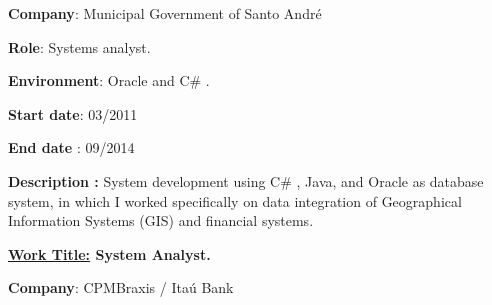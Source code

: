 \begin{itemize}
\begin{justify}
{\fontsize{10pt}{12.0pt}\selectfont \textbf{Company\tab }:\textbf{ }Municipal Government of Santo André\par}
\end{justify}\par

\begin{justify}
{\fontsize{10pt}{12.0pt}\selectfont \textbf{Role\tab \tab }: Systems analyst.\par}
\end{justify}\par

\begin{justify}
{\fontsize{10pt}{12.0pt}\selectfont \textbf{Environment}:\textbf{ }Oracle and C$\#$ . \par}
\end{justify}\par

\begin{justify}
{\fontsize{10pt}{12.0pt}\selectfont \textbf{Start date\tab }:\textbf{ }03/2011\par}
\end{justify}\par

\begin{justify}
{\fontsize{10pt}{12.0pt}\selectfont \textbf{End date \tabto{0.5in} }:\textbf{ }09/2014\par}
\end{justify}\par

\begin{justify}
{\fontsize{10pt}{12.0pt}\selectfont \textbf{Description \tab : }System development using C$\#$ , Java, and Oracle as database system, in which I worked specifically on data integration of Geographical Information Systems (GIS) and financial systems.\par}
\end{justify}\par


\vspace{\baselineskip}
\begin{justify}
\item {\fontsize{10pt}{12.0pt}\selectfont \textbf{\uline{Work Title:} \tab System Analyst.}\par}
\end{justify}\par

\begin{justify}
{\fontsize{10pt}{12.0pt}\selectfont \textbf{Company\tab }:\textbf{ }CPMBraxis / Itaú Bank\par}
\end{justify}\par


\end{itemize}
